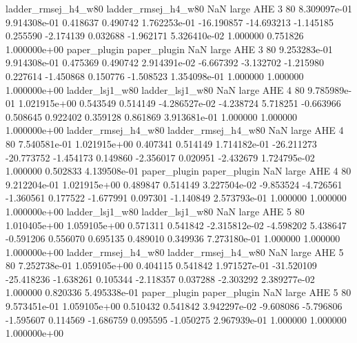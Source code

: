 ladder_rmsej_h4_w80 ladder_rmsej_h4_w80                   NaN      large      AHE                 3 80 8.309097e-01   9.914308e-01      0.418637       0.490742  1.762253e-01    -16.190857    -14.693213    -1.145185       0.255590 -2.174139   0.032688    -1.962171   5.326410e-02            1.000000        0.751826        1.000000e+00
       paper_plugin        paper_plugin                   NaN      large      AHE                 3 80 9.253283e-01   9.914308e-01      0.475369       0.490742  2.914391e-02     -6.667392     -3.132702    -1.215980       0.227614 -1.450868   0.150776    -1.508523   1.354098e-01            1.000000        1.000000        1.000000e+00
    ladder_lsj1_w80     ladder_lsj1_w80                   NaN      large      AHE                 4 80 9.785989e-01   1.021915e+00      0.543549       0.514149 -4.286527e-02     -4.238724      5.718251    -0.663966       0.508645  0.922402   0.359128     0.861869   3.913681e-01            1.000000        1.000000        1.000000e+00
ladder_rmsej_h4_w80 ladder_rmsej_h4_w80                   NaN      large      AHE                 4 80 7.540581e-01   1.021915e+00      0.407341       0.514149  1.714182e-01    -26.211273    -20.773752    -1.454173       0.149860 -2.356017   0.020951    -2.432679   1.724795e-02            1.000000        0.502833        4.139508e-01
       paper_plugin        paper_plugin                   NaN      large      AHE                 4 80 9.212204e-01   1.021915e+00      0.489847       0.514149  3.227504e-02     -9.853524     -4.726561    -1.360561       0.177522 -1.677991   0.097301    -1.140849   2.573793e-01            1.000000        1.000000        1.000000e+00
    ladder_lsj1_w80     ladder_lsj1_w80                   NaN      large      AHE                 5 80 1.010405e+00   1.059105e+00      0.571311       0.541842 -2.315812e-02     -4.598202      5.438647    -0.591206       0.556070  0.695135   0.489010     0.349936   7.273180e-01            1.000000        1.000000        1.000000e+00
ladder_rmsej_h4_w80 ladder_rmsej_h4_w80                   NaN      large      AHE                 5 80 7.252738e-01   1.059105e+00      0.404115       0.541842  1.971527e-01    -31.520109    -25.418236    -1.638261       0.105344 -2.118357   0.037288    -2.303292   2.389277e-02            1.000000        0.820336        5.495338e-01
       paper_plugin        paper_plugin                   NaN      large      AHE                 5 80 9.573451e-01   1.059105e+00      0.510432       0.541842  3.942297e-02     -9.608086     -5.796806    -1.595607       0.114569 -1.686759   0.095595    -1.050275   2.967939e-01            1.000000        1.000000        1.000000e+00
